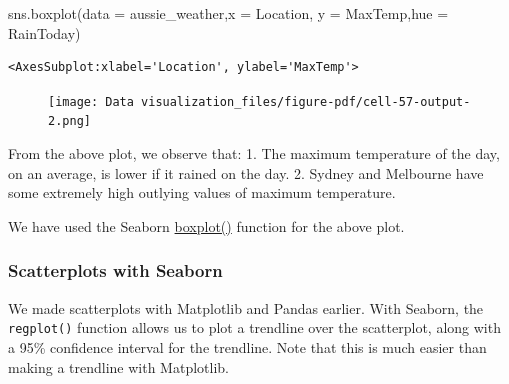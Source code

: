 \documentclass[
  letterpaper,
  DIV=11,
  numbers=noendperiod]{scrreprt}
\newenvironment{Shaded}{\begin{snugshade}}{\end{snugshade}}
\newcommand{\NormalTok}[1]{\textcolor[rgb]{0.00,0.23,0.31}{#1}}
\newcommand{\OperatorTok}[1]{\textcolor[rgb]{0.37,0.37,0.37}{#1}}
\newcommand{\StringTok}[1]{\textcolor[rgb]{0.13,0.47,0.30}{#1}}
\begin{document}
\begin{Shaded}
\begin{Highlighting}[]
\NormalTok{sns.boxplot(data }\OperatorTok{=}\NormalTok{ aussie\_weather,x }\OperatorTok{=} \StringTok{\textquotesingle{}Location\textquotesingle{}}\NormalTok{, y }\OperatorTok{=} \StringTok{\textquotesingle{}MaxTemp\textquotesingle{}}\NormalTok{,hue }\OperatorTok{=} \StringTok{\textquotesingle{}RainToday\textquotesingle{}}\NormalTok{)}
\end{Highlighting}
\end{Shaded}

\begin{verbatim}
<AxesSubplot:xlabel='Location', ylabel='MaxTemp'>
\end{verbatim}

\begin{figure}[H]

{\centering \texttt{[image: Data visualization\_files/figure-pdf/cell-57-output-2.png]}

}

\end{figure}

From the above plot, we observe that: 1. The maximum temperature of the
day, on an average, is lower if it rained on the day. 2. Sydney and
Melbourne have some extremely high outlying values of maximum
temperature.

We have used the Seaborn
\href{https://seaborn.pydata.org/generated/seaborn.boxplot.html}{boxplot()}
function for the above plot.

\hypertarget{scatterplots-with-seaborn}{%
\subsubsection{Scatterplots with
Seaborn}\label{scatterplots-with-seaborn}}

We made scatterplots with Matplotlib and Pandas earlier. With Seaborn,
the \texttt{regplot()} function allows us to plot a trendline over the
scatterplot, along with a 95\% confidence interval for the trendline.
Note that this is much easier than making a trendline with Matplotlib.
\end{document}
